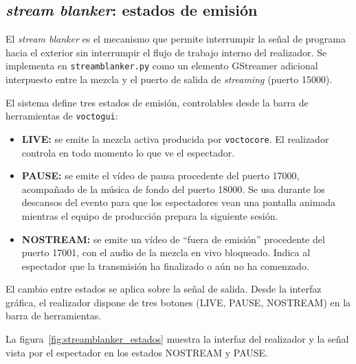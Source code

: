 \subsection{\textit{stream blanker}: estados de emisión}

El \textit{stream blanker} es el mecanismo que permite interrumpir la señal de programa hacia el
exterior sin interrumpir el flujo de trabajo interno del realizador. Se implementa en
\texttt{streamblanker.py} como un elemento GStreamer adicional interpuesto
entre la mezcla y el puerto de salida de \textit{streaming} (puerto 15000).

El sistema define tres estados de emisión, controlables desde la barra de herramientas
de \texttt{voctogui}:

\begin{itemize}
  \item \textbf{LIVE:} se emite la mezcla activa producida por \texttt{voctocore}. El realizador
        controla en todo momento lo que ve el espectador.
  \item \textbf{PAUSE:} se emite el vídeo de pausa procedente del puerto 17000,
        acompañado de la música de fondo del puerto 18000.
        Se usa durante los descansos del evento para que los espectadores vean una pantalla
        animada mientras el equipo de producción prepara la siguiente sesión.
  \item \textbf{NOSTREAM:} se emite un vídeo de ``fuera de emisión'' procedente del
        puerto 17001, con el audio de la mezcla en vivo bloqueado. Indica al espectador
        que la transmisión ha finalizado o aún no ha comenzado.
\end{itemize}

El cambio entre estados se aplica sobre la señal de salida.
Desde la interfaz gráfica, el realizador dispone de tres botones (LIVE, PAUSE,
NOSTREAM) en la barra de herramientas.

La figura~\ref{fig:streamblanker_estados} muestra la interfaz del realizador y la
señal vista por el espectador en los estados NOSTREAM y PAUSE.

